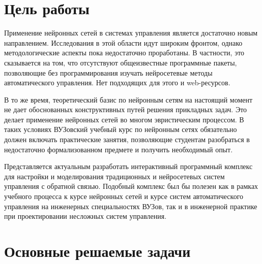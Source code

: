 

\section{Цель работы}

Применение нейронных сетей в системах управления является достаточно
новым направлением.  Исследования в этой области идут широким фронтом,
однако методологические аспекты пока недостаточно проработаны.  В
частности, это сказывается на том, что отсутствуют общеизвестные
программные пакеты, позволяющие без программирования изучать
нейросетевые методы автоматического управления.  Нет подходящих для
этого и web-ресурсов.

В то же время, теоретический базис по нейронным сетям на настоящий
момент не дает обоснованных конструктивных путей решения прикладных
задач.  Это делает применение нейронных сетей во многом эвристическим
процессом.  В таких условиях ВУЗовский учебный курс по нейронным сетях
обязательно должен включать практические занятия, позволяющие
студентам разобраться в недостаточно формализованном предмете и
получить необходимый опыт.

Представляется актуальным разработать интерактивный программный
комплекс для настройки и моделирования традиционных и нейросетевых
систем управления с обратной связью.  Подобный комплекс был бы полезен
как в рамках учебного процесса к курсе нейронных сетей и курсе систем
автоматического управления на инженерных специальностях ВУЗов, так и в
инженерной практике при проектировании несложных систем управления.

\section{Основные решаемые задачи}

